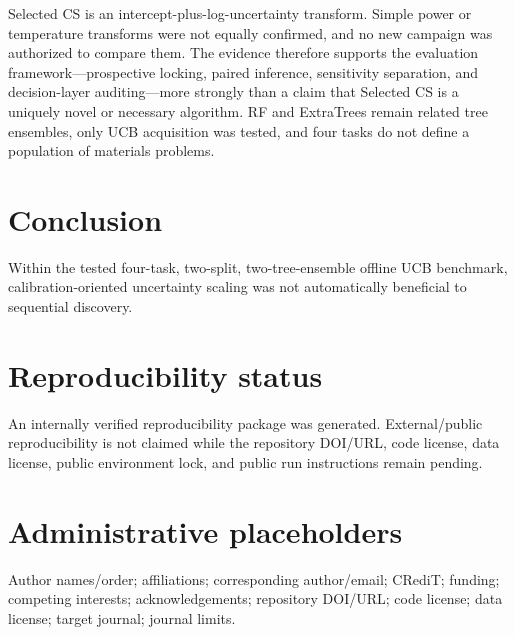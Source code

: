 \documentclass[10pt]{article}
\begin{document}
Selected CS is an intercept-plus-log-uncertainty transform. Simple power or
temperature transforms were not equally confirmed, and no new campaign was
authorized to compare them. The evidence therefore supports the evaluation
framework---prospective locking, paired inference, sensitivity separation, and
decision-layer auditing---more strongly than a claim that Selected CS is a
uniquely novel or necessary algorithm. RF and ExtraTrees remain related tree
ensembles, only UCB acquisition was tested, and four tasks do not define a
population of materials problems.

\section{Conclusion}
Within the tested four-task, two-split, two-tree-ensemble offline UCB benchmark, calibration-oriented uncertainty scaling was not automatically beneficial to sequential discovery.

\section*{Reproducibility status}
An internally verified reproducibility package was generated. External/public
reproducibility is not claimed while the repository DOI/URL, code license,
data license, public environment lock, and public run instructions remain
pending.

\section*{Administrative placeholders}
Author names/order; affiliations; corresponding author/email; CRediT; funding; competing interests; acknowledgements; repository DOI/URL; code license; data license; target journal; journal limits.


\end{document}
